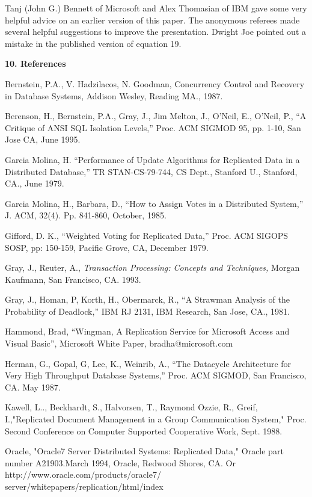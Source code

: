 \documentclass[a4paper,12pt,twoside,openright]{article}
\begin{document}
Tanj (John G.) Bennett of Microsoft and Alex Thomasian of IBM gave some
very helpful advice on an earlier version of this paper. The anonymous
referees made several helpful suggestions to improve the presentation.
Dwight Joe pointed out a mistake in the published version of equation
19.

\textbf{10. References}

Bernstein, P.A., V. Hadzilacos, N. Goodman, Concurrency Control and
Recovery in Database Systems, Addison Wesley, Reading MA., 1987.

Berenson, H., Bernstein, P.A., Gray, J., Jim Melton, J., O'Neil, E.,
O'Neil, P., ``A Critique of ANSI SQL Isolation Levels,'' Proc. ACM
SIGMOD 95, pp. 1-10, San Jose CA, June 1995.

Garcia Molina, H. ``Performance of Update Algorithms for Replicated Data
in a Distributed Database,'' TR STAN-CS-79-744, CS Dept., Stanford U.,
Stanford, CA., June 1979.

Garcia Molina, H., Barbara, D., ``How to Assign Votes in a Distributed
System,'' J. ACM, 32(4). Pp. 841-860, October, 1985.

Gifford, D. K., ``Weighted Voting for Replicated Data,'' Proc. ACM
SIGOPS SOSP, pp: 150-159, Pacific Grove, CA, December 1979.

Gray, J., Reuter, A., \emph{Transaction Processing: Concepts and
Techniques,} Morgan Kaufmann, San Francisco, CA. 1993.

Gray, J., Homan, P, Korth, H., Obermarck, R., ``A Strawman Analysis of
the Probability of Deadlock,'' IBM RJ 2131, IBM Research, San Jose, CA.,
1981.

Hammond, Brad, ``Wingman, A Replication Service for Microsoft Access and
Visual Basic'', Microsoft White Paper, bradha@microsoft.com

Herman, G., Gopal, G, Lee, K., Weinrib, A., ``The Datacycle Architecture
for Very High Throughput Database Systems,'' Proc. ACM SIGMOD, San
Francisco, CA. May 1987.

Kawell, L.., Beckhardt, S., Halvorsen, T., Raymond Ozzie, R., Greif,
I.,"Replicated Document Management in a Group Communication System,"
Proc. Second Conference on Computer Supported Cooperative Work, Sept.
1988.

Oracle, "Oracle7 Server Distributed Systems: Replicated Data," Oracle
part number A21903.March 1994, Oracle, Redwood Shores, CA. Or
http://www.oracle.com/products/oracle7/
server/whitepapers/replication/html/index
\end{document}
